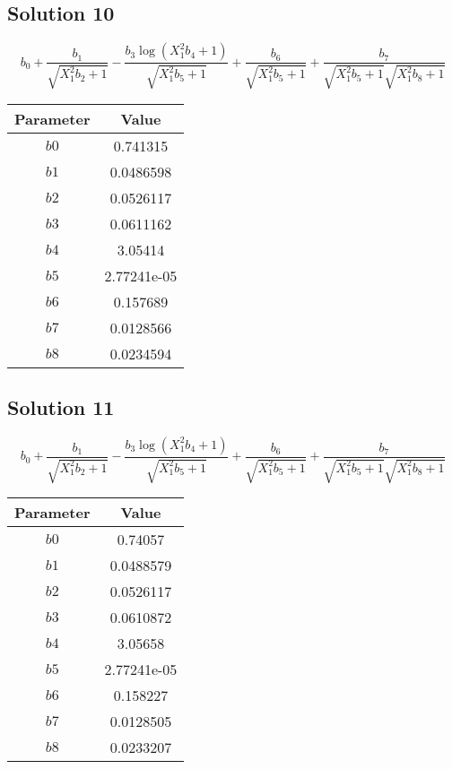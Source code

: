\documentclass{article}
\begin{document}
\subsection*{Solution 10}
\[
b_{0} + \frac{b_{1}}{\sqrt{X_{1}^{2} b_{2} + 1}} - \frac{b_{3} \log{\left(X_{1}^{2} b_{4} + 1 \right)}}{\sqrt{X_{1}^{2} b_{5} + 1}} + \frac{b_{6}}{\sqrt{X_{1}^{2} b_{5} + 1}} + \frac{b_{7}}{\sqrt{X_{1}^{2} b_{5} + 1} \sqrt{X_{1}^{2} b_{8} + 1}}
\]
\begin{center}
\begin{tabular}{cc}
\toprule
Parameter & Value \\
\midrule
$b0$ & 0.741315 \\
$b1$ & 0.0486598 \\
$b2$ & 0.0526117 \\
$b3$ & 0.0611162 \\
$b4$ & 3.05414 \\
$b5$ & 2.77241e-05 \\
$b6$ & 0.157689 \\
$b7$ & 0.0128566 \\
$b8$ & 0.0234594 \\
\bottomrule
\end{tabular}
\end{center}

\vspace{1em}
\subsection*{Solution 11}
\[
b_{0} + \frac{b_{1}}{\sqrt{X_{1}^{2} b_{2} + 1}} - \frac{b_{3} \log{\left(X_{1}^{2} b_{4} + 1 \right)}}{\sqrt{X_{1}^{2} b_{5} + 1}} + \frac{b_{6}}{\sqrt{X_{1}^{2} b_{5} + 1}} + \frac{b_{7}}{\sqrt{X_{1}^{2} b_{5} + 1} \sqrt{X_{1}^{2} b_{8} + 1}}
\]
\begin{center}
\begin{tabular}{cc}
\toprule
Parameter & Value \\
\midrule
$b0$ & 0.74057 \\
$b1$ & 0.0488579 \\
$b2$ & 0.0526117 \\
$b3$ & 0.0610872 \\
$b4$ & 3.05658 \\
$b5$ & 2.77241e-05 \\
$b6$ & 0.158227 \\
$b7$ & 0.0128505 \\
$b8$ & 0.0233207 \\
\bottomrule
\end{tabular}
\end{center}
\end{document}
